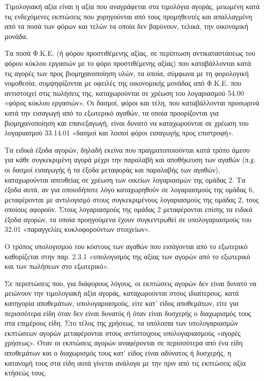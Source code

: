 \documentclass[A4,10pt,greek]{book}
\begin{document}
Τιμολογιακή αξία είναι η αξία που αναγράφεται στα τιμολόγια αγοράς, μειωμένη κατά τις ενδεχόμενες εκπτώσεις που χορηγούνται από τους προμηθευτές και απαλλαγμένη από τα ποσά των φόρων και τελών τα οποία δεν βαρύνουν, τελικά, την οικονομική μονάδα.

Τα ποσά Φ.Κ.Ε. (ή φόρου προστιθέμενης αξίας, σε περίπτωση αντικαταστάσεως του φόρου κύκλου εργασιών με το φόρο προστιθέμενης αξίας) που καταβάλλονται κατά τις αγορές των προς βιομηχανοποίηση υλών, τα οποία, σύμφωνα με τη φορολογική νομοθεσία, συμψηφίζονται με οφειλές της οικονομικής μονάδας από Φ.Κ.Ε. που αντιστοιχεί στις πωλήσεις της, καταχωρούνται σε χρέωση του λογαριασμού 54.00 «φόρος κύκλου εργασιών». Οι δασμοί, φόροι και τέλη, που καταβάλλονται προσωρινά κατά την εισαγωγή από το εξωτερικό αγαθών, τα οποία προορίζονται για βιομηχανοποίηση και επανεξαγωγή, είναι δυνατό να καταχωρούνται σε χρέωση του λογαριασμού 33.14.01 «δασμοί και λοιποί φόροι εισαγωγής προς επιστροφή».

Τα ειδικά έξοδα αγορών, δηλαδή εκείνα που πραγματοποιούνται κατά τρόπο άμεσο για κάθε συγκεκριμένη αγορά μέχρι την παραλαβή και αποθήκευση των αγαθών (π.χ. οι δασμοί εισαγωγής ή τα έξοδα μεταφοράς και παραλαβής των αγαθών), καταχωρούνται απευθείας σε χρέωση των οικείων λογαριασμών της ομάδας 2. Τα έξοδα αυτά, αν για οποιοδήποτε λόγο καταχωρηθούν σε λογαριασμούς της ομάδας 6, μεταφέρονται με αντιλογισμό στους συγκεκριμένους λογαριασμούς της ομάδας 2, τους οποίους αφορούν. Στους λογαριασμούς της ομάδας 2 μεταφέρονται επίσης τα ειδικά έξοδα αγορών, τα οποία προηγούμενα έχουν συγκεντρωθεί σε υπολογαριασμούς του 32.01 «παραγγελίες κυκλοφορούντων στοιχείων».

Ο τρόπος υπολογισμού του κόστους των αγαθών που εισάγονται από το εξωτερικό καθορίζεται στην παρ. 2.3.1 «υπολογισμός της αξίας των αγορών από το εξωτερικό και των πωλήσεων στο εξωτερικό».

Σε περιπτώσεις που, για διάφορους λόγους, οι εκπτώσεις αγορών δεν είναι δυνατό να μειώνουν την τιμολογιακή αξία αγοράς, καταχωρούνται στους ιδιαίτερους, κατά κατηγορία αποθεμάτων, υπολογαριασμούς, είτε κατ' είδος αποθεμάτων, είτε για περισσότερα είδη όταν δεν είναι δυνατός ή όταν είναι δυσχερής ο διαχωρισμός τους στα επιμέρους είδη. Στο τέλος της χρήσεως, τα υπόλοιπα των υπολογαριασμών εκπτώσεων αγορών μεταφέρονται στους αντίστοιχους υπολογαριασμούς «αγορές χρήσεως». Όταν οι εκπτώσεις αγορών αναφέρονται σε περισσότερα από ένα είδη αποθεμάτων και ο διαχωρισμός τους κατ' είδος είναι αδύνατος ή δυσχερής, η κατανομή τους στα είδη αυτά γίνεται ανάλογα με την πριν από τις εκπτώσεις αξία κτήσεώς τους.
\end{document}

